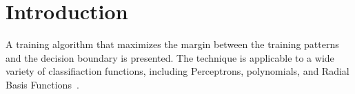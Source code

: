 \documentclass[12pt]{article}
\begin{document}
\section{Introduction}

A training algorithm that maximizes the margin between the training patterns and
the decision boundary is presented. The technique is applicable to a wide
variety of classifiaction functions, including Perceptrons, polynomials, and
Radial Basis Functions~\parencite{Boser1992}.

\printbibliography[heading=bibintoc]
\end{document}
